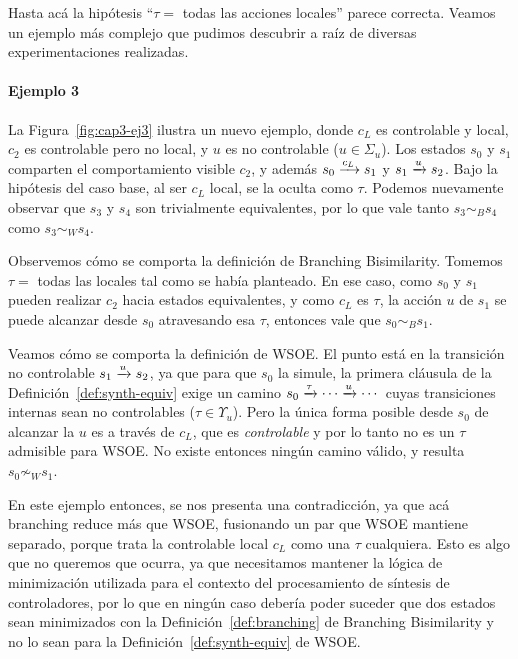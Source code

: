 Hasta acá la hipótesis ``$\tau =$ todas las acciones locales'' parece correcta. Veamos un ejemplo más complejo que pudimos descubrir a raíz de diversas experimentaciones realizadas.

\paragraph{Ejemplo 3}
La Figura~\ref{fig:cap3-ej3} ilustra un nuevo ejemplo, donde $c_L$ es controlable y local, $c_2$ es controlable pero no local, y $u$ es no controlable ($u \in \Sigma_u$). Los estados $s_0$ y $s_1$ comparten el comportamiento visible $c_2$, y además $s_0 \pijl{c_L} s_1$ y $s_1 \pijl{u} s_2$. Bajo la hipótesis del caso base, al ser $c_L$ local, se la oculta como $\tau$. Podemos nuevamente observar que $s_3$ y $s_4$ son trivialmente equivalentes, por lo que vale tanto $s_3 \sim_{B} s_4$ como $s_3 \sim_{W} s_4$.

Observemos cómo se comporta la definición de Branching Bisimilarity. Tomemos $\tau =$ todas las locales tal como se había planteado. En ese caso, como $s_0$ y $s_1$ pueden realizar $c_2$ hacia estados equivalentes, y como $c_L$ es $\tau$, la acción $u$ de $s_1$ se puede alcanzar desde $s_0$ atravesando esa $\tau$, entonces vale que $s_0 \sim_{B} s_1$.

Veamos cómo se comporta la definición de WSOE. El punto está en la transición no controlable $s_1 \pijl{u} s_2$, ya que para que $s_0$ la simule, la primera cláusula de la Definición~\ref{def:synth-equiv} exige un camino $s_0 \pijl{\tau}\cdots\pijl{u}\cdots$ cuyas transiciones internas sean no controlables ($\tau \in \Upsilon_u$). Pero la única forma posible desde $s_0$ de alcanzar la $u$ es a través de $c_L$, que es \textit{controlable} y por lo tanto no es un $\tau$ admisible para WSOE. No existe entonces ningún camino válido, y resulta $s_0 \not\sim_{W} s_1$.

En este ejemplo entonces, se nos presenta una contradicción, ya que acá branching reduce más que WSOE, fusionando un par que WSOE mantiene separado, porque trata la controlable local $c_L$ como una $\tau$ cualquiera. Esto es algo que no queremos que ocurra, ya que necesitamos mantener la lógica de minimización utilizada para el contexto del procesamiento de síntesis de controladores, por lo que en ningún caso debería poder suceder que dos estados sean minimizados con la Definición~\ref{def:branching} de Branching Bisimilarity y no lo sean para la Definición~\ref{def:synth-equiv} de WSOE.

